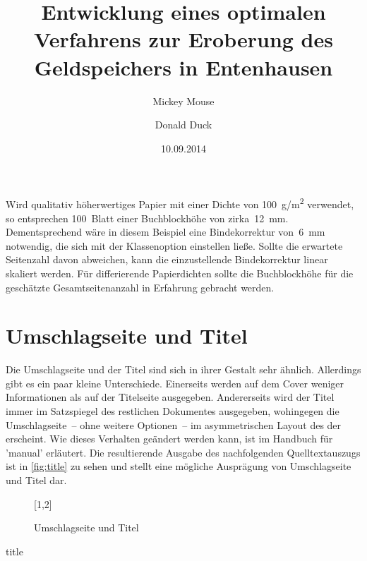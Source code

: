 \documentclass[%
  english,ngerman,%
  cdgeometry=no,DIV=12,automark,%
]{tudscrartcl}
\begin{document}
Wird qualitativ höherwertiges Papier mit einer Dichte von \SI{100}{g/m^2} 
verwendet, so entsprechen 100~Blatt einer Buchblockhöhe von zirka~\SI{12}{mm}. 
Dementsprechend wäre in diesem Beispiel eine Bindekorrektur von~\SI{6}{mm} 
notwendig, die sich mit der Klassenoption  einstellen ließe. 
Sollte die erwartete Seitenzahl davon abweichen, kann die einzustellende 
Bindekorrektur linear skaliert werden. Für differierende Papierdichten sollte 
die Buchblockhöhe für die geschätzte Gesamtseitenanzahl in Erfahrung gebracht 
werden.



\section{Umschlagseite und Titel}
Die Umschlagseite und der Titel sind sich in ihrer Gestalt sehr ähnlich. 
Allerdings gibt es ein paar kleine Unterschiede. Einerseits werden auf dem 
Cover weniger Informationen als auf der Titelseite ausgegeben. Andererseits 
wird der Titel immer im Satzspiegel des restlichen Dokumentes ausgegeben, 
wohingegen die Umschlagseite~-- ohne weitere Optionen~-- im asymmetrischen 
Layout des \CDs der \TnUD erscheint. Wie dieses Verhalten geändert werden kann, 
ist im Handbuch für 'manual' erläutert. Die resultierende 
Ausgabe des nachfolgenden Quelltextauszugs ist in \autoref{fig:title} zu sehen 
und stellt eine mögliche Ausprägung von Umschlagseite und Titel dar.
%
\begin{figure}
[1,2]
\caption{Umschlagseite und Titel}
\label{fig:title}
\end{figure}

\begin{Trunk!}{title}
\title{%
  Entwicklung eines optimalen Verfahrens zur Eroberung des
  Geldspeichers in Entenhausen
}
\author{%
  Mickey Mouse%
\and%
  Donald Duck%
}
\date{10.09.2014}
\makecover
\maketitle

\end{Trunk!}
\end{document}
